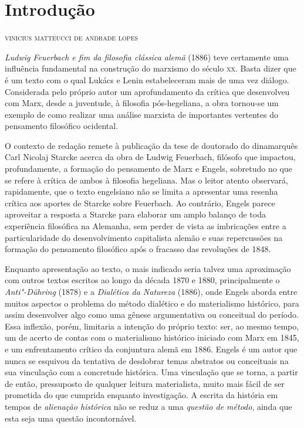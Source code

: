 \chapter[Introdução]{Introdução }

\begin{flushright}
\textsc{vinicius matteucci de andrade lopes}
\end{flushright}

\noindent{}\emph{Ludwig Feuerbach e fim da filosofia clássica alemã} (1886) teve
certamente uma influência fundamental na construção do marxismo do
século \textsc{xx}. Basta dizer que é um texto com o qual Lukács e Lenin
estabeleceram mais de uma vez diálogo. Considerada pelo próprio autor um aprofundamento da crítica que desenvolveu com Marx, desde a juventude, à filosofia pós-hegeliana, a obra tornou-se um exemplo de como realizar uma análise marxista de importantes vertentes do pensamento filosófico ocidental.

O contexto de redação remete à publicação da tese de doutorado do dinamarquês Carl Nicolaj Starcke acerca da obra de Ludwig Feuerbach, filósofo que impactou, profundamente, a formação do pensamento de Marx e Engels, sobretudo no que se refere à crítica de ambos à filosofia hegeliana. Mas o leitor atento observará, rapidamente, que o texto engelsiano não se limita a apresentar uma resenha crítica aos aportes de Starcke sobre Feuerbach. Ao contrário, Engels parece aproveitar a resposta a Starcke para elaborar um amplo balanço de toda experiência filosófica na Alemanha, sem perder de vista as imbricações entre a particularidade do desenvolvimento capitalista alemão e suas repercussões na formação do pensamento filosófico após o fracasso das revoluções de 1848.

Enquanto apresentação ao texto, o
mais indicado seria talvez uma aproximação com outros textos escritos ao
longo da década 1870 e 1880, principalmente o \emph{Anti"-Dühring} (1878)
e a \emph{Dialética da Natureza} (1886), onde Engels aborda entre muitos
aspectos o problema do método dialético e do materialismo histórico,
para assim desenvolver algo como uma gênese argumentativa ou conceitual
do período. Essa inflexão, porém, limitaria a intenção do próprio texto:
ser, ao mesmo tempo, um de acerto de contas com o materialismo histórico
iniciado com Marx em 1845, e um enfrentamento crítico da conjuntura
alemã em 1886. Engels é um autor que nunca se esquivou da tentativa de
desdobrar temas abstratos ou conceituais na sua vinculação com a
concretude histórica. Uma vinculação que se torna, a partir de então,
pressuposto de qualquer leitura materialista, muito mais fácil de ser
prometida do que cumprida enquanto investigação. A escrita da história
em tempos de \emph{alienação histórica} não se reduz a uma \emph{questão
de método}, ainda que esta seja uma questão incontornável.

